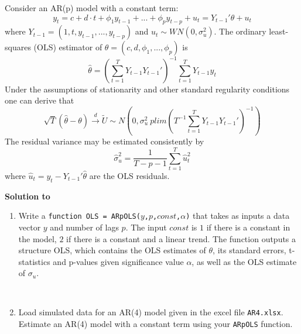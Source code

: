 Consider an AR(p) model with a constant term:
$$ y_t = c + d\cdot t + \phi_1 y_{t-1} +... + \phi_p y_{t-p} +u_{t}=Y_{t-1}'\theta + u_t$$
where $Y_{t-1}=(1,t,y_{t-1},...,y_{t-p})$ and $u_t\sim WN(0,\sigma_u^2)$. The ordinary least-squares (OLS) estimator of $\theta = (c,d,\phi_1,...,\phi_p)$ is $$\hat{\theta} = \left(\sum_{t=1}^TY_{t-1}Y_{t-1}'\right)^{-1}\sum_{t=1}^T Y_{t-1} y_t$$ Under the assumptions of stationarity and other standard regularity conditions one can derive that
$$\sqrt{T}(\hat{\theta}-\theta)\overset{d}{\rightarrow}\tilde{U}\sim N\left(0,\sigma_u^2 ~plim\left(T^{-1}\sum_{t=1}^T Y_{t-1}Y_{t-1}'\right)^{-1} \right)$$
The residual variance may be estimated consistently by $$\hat{\sigma}_u^2 = \frac{1}{T-p-1}\sum_{t=1}^T\hat{u}_t^2$$ where $\hat{u}_t=y_t -Y_{t-1}'\hat{\theta}$ are the OLS residuals.
\begin{solution}\textbf{Solution to }\end{solution}

\begin{enumerate}
    \item Write a \texttt{function OLS = ARpOLS($y$,$p$,$const$,$\alpha$)} that takes as inputs a data vector $y$ and number of lags $p$. The input $const$ is $1$ if there is a constant in the model, $2$ if there is a constant and a linear trend. The function outputs a structure OLS, which contains the OLS estimates of $\theta$, its standard errors, t-statistics and p-values given significance value $\alpha$, as well as the OLS estimate of $\sigma_u$.
          \begin{solution}~
              
          \end{solution}
    \item Load simulated data for an AR(4) model given in the excel file \texttt{AR4.xlsx}. Estimate an AR(4) model with a constant term using your \texttt{ARpOLS} function.
          \begin{solution}~
              
          \end{solution}
\end{enumerate}
